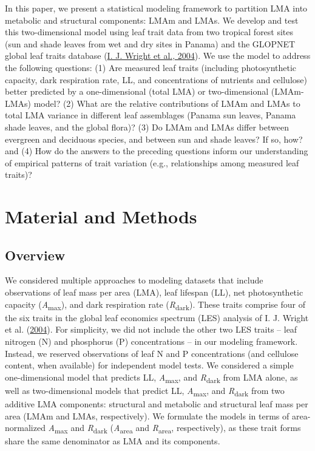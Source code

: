 \documentclass[
  12pt,
  letterpaper,
  DIV=11,
  numbers=noendperiod]{scrartcl}
\begin{document}
In this paper, we present a statistical modeling framework to partition
LMA into metabolic and structural components: LMAm and LMAs. We develop
and test this two-dimensional model using leaf trait data from two
tropical forest sites (sun and shade leaves from wet and dry sites in
Panama) and the GLOPNET global leaf traits database
(\protect\hyperlink{ref-Wright2004a}{I. J. Wright et al., 2004}). We use
the model to address the following questions: (1) Are measured leaf
traits (including photosynthetic capacity, dark respiration rate, LL,
and concentrations of nutrients and cellulose) better predicted by a
one-dimensional (total LMA) or two-dimensional (LMAm-LMAs) model? (2)
What are the relative contributions of LMAm and LMAs to total LMA
variance in different leaf assemblages (Panama sun leaves, Panama shade
leaves, and the global flora)? (3) Do LMAm and LMAs differ between
evergreen and deciduous species, and between sun and shade leaves? If
so, how? and (4) How do the answers to the preceding questions inform
our understanding of empirical patterns of trait variation (e.g.,
relationships among measured leaf traits)?

\hypertarget{material-and-methods}{%
\section{Material and Methods}\label{material-and-methods}}

\hypertarget{overview}{%
\subsection{Overview}\label{overview}}

We considered multiple approaches to modeling datasets that include
observations of leaf mass per area (LMA), leaf lifespan (LL), net
photosynthetic capacity (\emph{A}\textsubscript{max}), and dark
respiration rate (\emph{R}\textsubscript{dark}). These traits comprise
four of the six traits in the global leaf economics spectrum (LES)
analysis of I. J. Wright et al.
(\protect\hyperlink{ref-Wright2004a}{2004}). For simplicity, we did not
include the other two LES traits -- leaf nitrogen (N) and phosphorus (P)
concentrations -- in our modeling framework. Instead, we reserved
observations of leaf N and P concentrations (and cellulose content, when
available) for independent model tests. We considered a simple
one-dimensional model that predicts LL, \emph{A}\textsubscript{max}, and
\emph{R}\textsubscript{dark} from LMA alone, as well as two-dimensional
models that predict LL, \emph{A}\textsubscript{max}, and
\emph{R}\textsubscript{dark} from two additive LMA components:
structural and metabolic and structural leaf mass per area (LMAm and
LMAs, respectively). We formulate the models in terms of area-normalized
\emph{A}\textsubscript{max} and \emph{R}\textsubscript{dark}
(\emph{A}\textsubscript{area} and \emph{R}\textsubscript{area},
respectively), as these trait forms share the same denominator as LMA
and its components.
\end{document}
